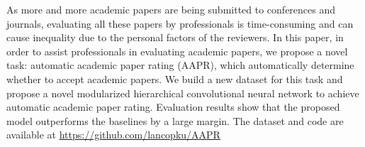As more and more academic papers are being submitted to conferences and journals, evaluating all these papers by professionals is time-consuming and can cause inequality due to the personal factors of the reviewers. In this paper, in order to assist professionals in evaluating academic papers, we propose a novel task: automatic academic paper rating (AAPR), which automatically determine whether to accept academic papers. We build a new dataset for this task and propose a novel modularized hierarchical convolutional neural network to achieve automatic academic paper rating. Evaluation results show that the proposed model outperforms the baselines by a large margin. The dataset and code are available at \url{https://github.com/lancopku/AAPR}

